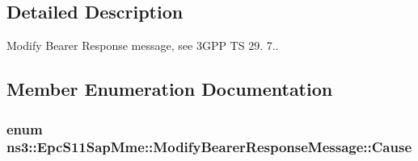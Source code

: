 \subsection{Detailed Description}
Modify Bearer Response message, see 3\+G\+PP TS 29. 7.. 

\subsection{Member Enumeration Documentation}
\subsubsection[{\texorpdfstring{Cause}{Cause}}]{\setlength{\rightskip}{0pt plus 5cm}enum {\bf ns3\+::\+Epc\+S11\+Sap\+Mme\+::\+Modify\+Bearer\+Response\+Message\+::\+Cause}}\hypertarget{structns3_1_1EpcS11SapMme_1_1ModifyBearerResponseMessage_a0f5caf9b54d24e8298ba8878ef1f773c}{}\label{structns3_1_1EpcS11SapMme_1_1ModifyBearerResponseMessage_a0f5caf9b54d24e8298ba8878ef1f773c}
